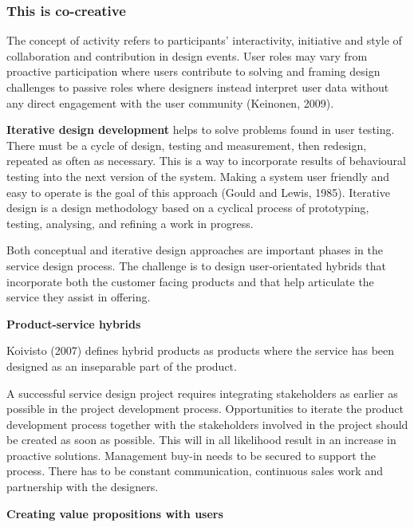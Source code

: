 \subsubsection{This is co-creative}

The concept of activity refers to participants’ interactivity, initiative and style of collaboration and contribution in design events. User roles may vary from proactive participation where users contribute to solving and framing design challenges to passive roles where designers instead interpret user data without any direct engagement with the user community (Keinonen, 2009).

\textbf{Iterative design development} helps to solve problems found in user testing. There must be a cycle of design, testing and measurement, then redesign, repeated as often as necessary. This is a way to incorporate results of behavioural testing into the next version of the system. Making a system user friendly and easy to operate is the goal of this approach (Gould and Lewis, 1985). Iterative design is a design methodology based on a cyclical process of prototyping, testing, analysing, and refining a work in progress.

Both conceptual and iterative design approaches are important phases in the service design process. The challenge is to design user-orientated hybrids that incorporate both the customer facing products and that help articulate the service they assist in offering.

\textbf{Product-service hybrids}

Koivisto (2007) defines hybrid products as products where the service has been designed as an inseparable part of the product. %

A successful service design project requires integrating stakeholders as earlier as possible in the project development process. Opportunities to iterate the product development process together with the stakeholders involved in the project should be created as soon as possible. This will in all likelihood result in an increase in proactive solutions. Management buy-in needs to be secured to support the process. There has to be constant communication, continuous sales work and partnership with the designers.

\textbf{Creating value propositions with users}

